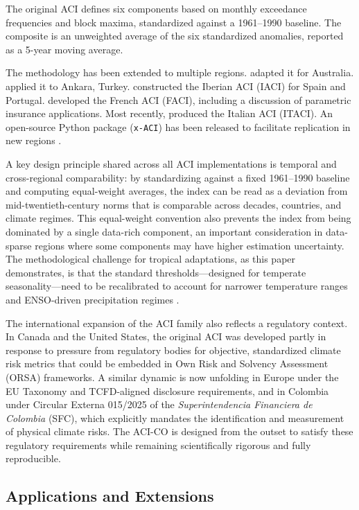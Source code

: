 \documentclass[12pt]{article}
\begin{document}
The original ACI \citep{aci2016} defines six components based on monthly exceedance frequencies and block maxima, standardized against a 1961--1990 baseline. The composite is an unweighted average of the six standardized anomalies, reported as a 5-year moving average.
 
The methodology has been extended to multiple regions. \citet{aaci2018} adapted it for Australia. \citet{nevruz2022} applied it to Ankara, Turkey. \citet{zhou2023iaci} constructed the Iberian ACI (IACI) for Spain and Portugal. \citet{garrido2023faci} developed the French ACI (FACI), including a discussion of parametric insurance applications. Most recently, \citet{rogo2025} produced the Italian ACI (ITACI). An open-source Python package (\texttt{x-ACI}) has been released to facilitate replication in new regions \citep{milhaud2025xaci}.

A key design principle shared across all ACI implementations is temporal and cross-regional comparability: by standardizing against a fixed 1961--1990 baseline and computing equal-weight averages, the index can be read as a deviation from mid-twentieth-century norms that is comparable across decades, countries, and climate regimes. This equal-weight convention also prevents the index from being dominated by a single data-rich component, an important consideration in data-sparse regions where some components may have higher estimation uncertainty. The methodological challenge for tropical adaptations, as this paper demonstrates, is that the standard thresholds---designed for temperate seasonality---need to be recalibrated to account for narrower temperature ranges and ENSO-driven precipitation regimes \citep{valla2025}.

The international expansion of the ACI family also reflects a regulatory context. In Canada and the United States, the original ACI was developed partly in response to pressure from regulatory bodies for objective, standardized climate risk metrics that could be embedded in Own Risk and Solvency Assessment (ORSA) frameworks. A similar dynamic is now unfolding in Europe under the EU Taxonomy and TCFD-aligned disclosure requirements, and in Colombia under Circular Externa 015/2025 of the \emph{Superintendencia Financiera de Colombia} (SFC), which explicitly mandates the identification and measurement of physical climate risks. The ACI-CO is designed from the outset to satisfy these regulatory requirements while remaining scientifically rigorous and fully reproducible.
 
\subsection{Applications and Extensions}
 
\end{document}
